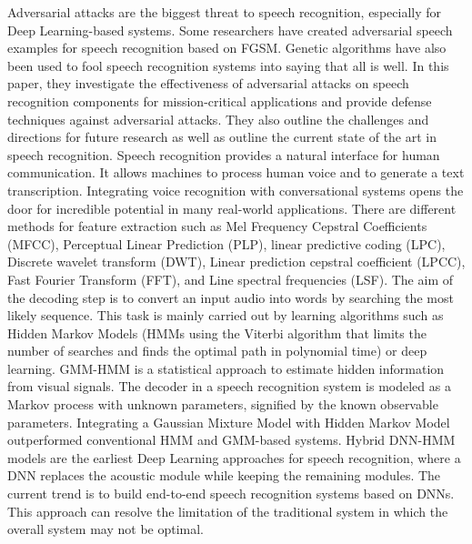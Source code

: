 Adversarial attacks \parencite{12} are the biggest threat to speech recognition, especially for Deep Learning-based systems. Some researchers have created adversarial speech examples for speech recognition based on FGSM. Genetic algorithms have also been used to fool speech recognition systems into saying that all is well. In this paper, they investigate the effectiveness of adversarial attacks on speech recognition components for mission-critical applications and provide defense techniques against adversarial attacks. They also outline the challenges and directions for future research as well as outline the current state of the art in speech recognition. Speech recognition provides a natural interface for human communication. It allows machines to process human voice and to generate a text transcription. Integrating voice recognition with conversational systems opens the door for incredible potential in many real-world applications. There are different methods for feature extraction such as Mel Frequency Cepstral Coefficients (MFCC), Perceptual Linear Prediction (PLP), linear predictive coding (LPC), Discrete wavelet transform (DWT), Linear prediction cepstral coefficient (LPCC), Fast Fourier Transform (FFT), and Line spectral frequencies (LSF). The aim of the decoding step is to convert an input audio into words by searching the most likely sequence. This task is mainly carried out by learning algorithms such as Hidden Markov Models (HMMs using the Viterbi algorithm that limits the number of searches and finds the optimal path in polynomial time) or deep learning. GMM-HMM is a statistical approach to estimate hidden information from visual signals. The decoder in a speech recognition system is modeled as a Markov process with unknown parameters, signified by the known observable parameters. Integrating a Gaussian Mixture Model with Hidden Markov Model outperformed conventional HMM and GMM-based systems. Hybrid DNN-HMM models are the earliest Deep Learning approaches for speech recognition, where a DNN replaces the acoustic module while keeping the remaining modules. The current trend is to build end-to-end speech recognition systems based on DNNs. This approach can resolve the limitation of the traditional system in which the overall system may not be optimal.

